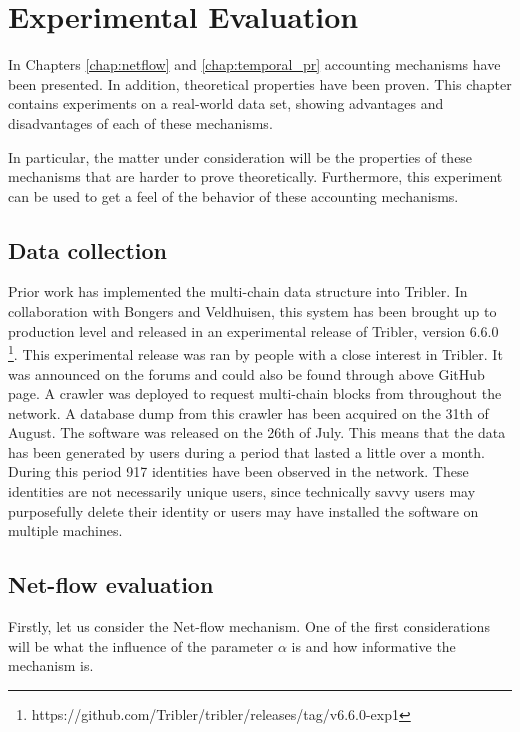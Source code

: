 \documentclass[a4paper,11pt]{book}
\theoremstyle{definition}
\begin{document}
\chapter{Experimental Evaluation}
\label{chap:exp}

In Chapters \ref{chap:netflow} and \ref{chap:temporal_pr} accounting mechanisms have been presented.
In addition, theoretical properties have been proven. This chapter contains experiments on a real-world
data set, showing advantages and disadvantages of each of these mechanisms.

In particular, the matter under consideration will be the properties of these mechanisms that are
harder to prove theoretically. Furthermore, this experiment can be used to get a feel of the behavior
of these accounting mechanisms.

\section{Data collection}

Prior work %
has implemented the multi-chain data structure into Tribler. In collaboration with Bongers and Veldhuisen,
this system has been brought up to production level and released in an experimental release of Tribler,
version 6.6.0 \footnote{https://github.com/Tribler/tribler/releases/tag/v6.6.0-exp1}. This experimental
release was ran by people with a close interest in Tribler. It was announced on the forums and could
also be found through above GitHub page. A crawler was deployed to request multi-chain blocks from throughout
the network. A database dump from this crawler has been acquired on the 31th of August. The software
was released on the 26th of July. This means that the data has been generated by users during a period
that lasted a little over a month. During this period 917 identities have been observed in the network.
These identities are not necessarily unique users, since technically savvy users may purposefully 
delete their identity or users may have installed the software on multiple machines.

\section{Net-flow evaluation}

Firstly, let us consider the Net-flow mechanism. One of the first considerations will be what the influence
of the parameter $\alpha$ is and how informative the mechanism is.
\end{document}
